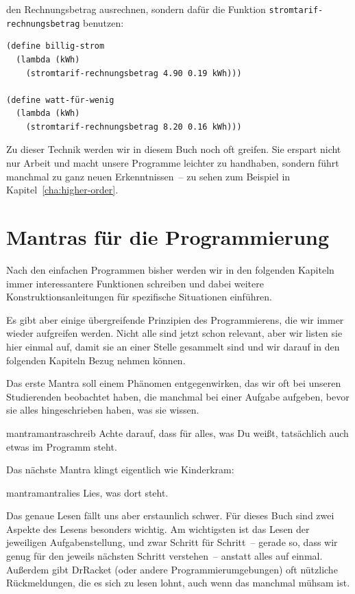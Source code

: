 den Rechnungsbetrag ausrechnen, sondern dafür die Funktion
\lstinline{stromtarif-rechnungsbetrag} benutzen:
%
\begin{lstlisting}
(define billig-strom
  (lambda (kWh)
    (stromtarif-rechnungsbetrag 4.90 0.19 kWh)))

(define watt-für-wenig
  (lambda (kWh)
    (stromtarif-rechnungsbetrag 8.20 0.16 kWh)))
\end{lstlisting}
%
Zu dieser Technik werden wir in diesem Buch noch oft greifen.  Sie
erspart nicht nur Arbeit und macht unsere Programme leichter zu
handhaben, sondern führt manchmal zu ganz neuen Erkenntnissen~--
zu sehen zum Beispiel in Kapitel~\ref{cha:higher-order}.

\section{Mantras für die Programmierung}

Nach den einfachen Programmen bisher werden wir in den
folgenden Kapiteln immer interessantere Funktionen schreiben und dabei
weitere Konstruktionsanleitungen für spezifische Situationen
einführen.

Es gibt aber einige übergreifende Prinzipien des Programmierens, die
wir immer wieder aufgreifen werden.  Nicht alle sind jetzt schon
relevant, aber wir listen sie hier einmal auf, damit sie an einer
Stelle gesammelt sind und wir darauf in den folgenden Kapiteln Bezug
nehmen können.

Das erste Mantra soll einem Phänomen entgegenwirken, das wir oft bei
unseren Studierenden beobachtet haben, die manchmal bei einer Aufgabe
aufgeben, bevor sie alles hingeschrieben haben, was sie wissen.
%
\begin{restatable}{mantra}{mantraschreib}
  \label{mantra:schreib}
  Achte darauf, dass für alles, was Du weißt, tatsächlich auch etwas
  im Programm steht.
\end{restatable}
% 
\noindent Das nächste Mantra klingt eigentlich wie Kinderkram:
%
\begin{restatable}{mantra}{mantralies}
  \label{mantra:lies}
  Lies, was dort steht.
\end{restatable}
% 
\noindent Das genaue Lesen fällt uns aber erstaunlich schwer.  Für dieses Buch
sind zwei Aspekte des Lesens besonders wichtig.  Am wichtigsten ist
das Lesen der jeweiligen Aufgabenstellung, und zwar Schritt für
Schritt~-- gerade so, dass wir genug für den jeweils nächsten Schritt
verstehen~-- anstatt alles auf einmal. Außerdem gibt DrRacket (oder
andere Programmierumgebungen) oft nützliche Rückmeldungen, die es sich
zu lesen lohnt, auch wenn das manchmal mühsam ist.

